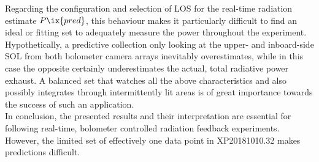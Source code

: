             Regarding the configuration and selection of LOS for the real-time radiation estimate $P\ix{pred}$, this behaviour makes it particularly difficult to find an ideal or fitting set to adequately measure the power throughout the experiment. Hypothetically, a predictive collection only looking at the upper- and inboard-side SOL from both bolometer camera arrays inevitably overestimates, while in this case the opposite certainly underestimates the actual, total radiative power exhaust. A balanced set that watches all the above characteristics and also possibly integrates through intermittently lit areas is of great importance towards the success of such an application.\\%
            In conclusion, the presented results and their interpretation are essential for following real-time, bolometer controlled radiation feedback experiments. However, the limited set of effectively one data point in XP20181010.32 makes predictions difficult.%
%
